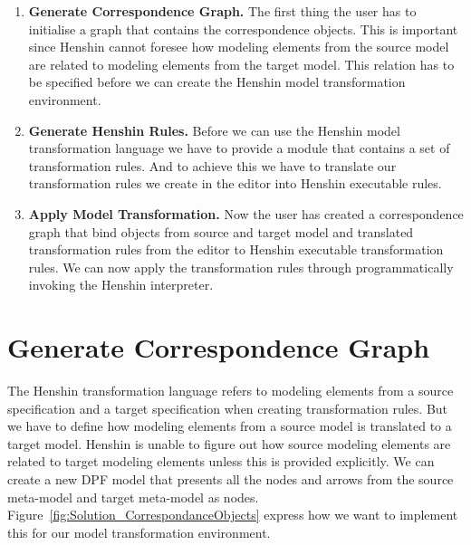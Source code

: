 \begin{enumerate}

\item \textbf{Generate Correspondence Graph.} The first thing the user has to
initialise a graph that contains the correspondence objects. This is important since
Henshin cannot foresee how modeling elements from the source model are related
to modeling elements from the target model. This relation has to be specified
before we can create the Henshin model transformation environment. 

\item \textbf{Generate Henshin Rules.} Before we can use the Henshin model
transformation language we have to provide a module that contains a set of transformation
rules. And to achieve this we have to translate our transformation rules we
create in the editor into Henshin executable rules. 

\item \textbf{Apply Model Transformation.} Now the user has created a
correspondence graph that bind objects from source and target model and
translated transformation rules from the editor to Henshin executable
transformation rules. We can now apply the transformation rules through
programmatically invoking the Henshin interpreter.

\end{enumerate}


\section{Generate Correspondence Graph}

The Henshin transformation language refers to modeling elements from a source
specification and a target specification when creating transformation rules. But
we have to define how modeling elements from a source model is translated to a
target model. Henshin is unable to figure out how source modeling elements are
related to target modeling elements unless this is provided explicitly. We can
create a new DPF model that presents all the nodes and arrows from the source
meta-model and target meta-model as nodes.
Figure~\ref{fig:Solution_CorrespondanceObjects} express how we want to implement
this for our model transformation environment.

